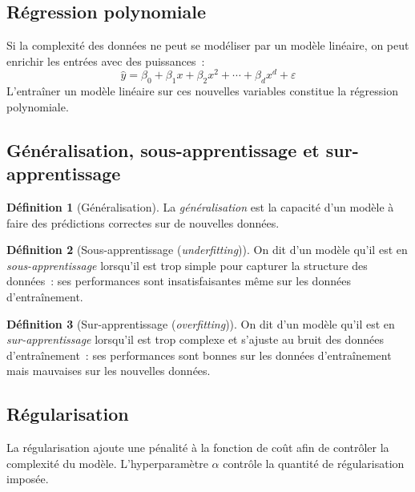 \documentclass[a4paper,12pt,twoside]{report}
\theoremstyle{definition}
\newtheorem{defi}{Définition}
\theoremstyle{plain}
\theoremstyle{remark}
\begin{document}
\subsection{Régression polynomiale}

Si la complexité des données ne peut se modéliser par un modèle linéaire, on peut enrichir
les entrées avec des puissances~:
\[
\hat{y} = \beta_0 + \beta_1 x + \beta_2 x^2 + \cdots + \beta_d x^d + \varepsilon
\]
L'entraîner un modèle linéaire sur ces nouvelles variables constitue la régression polynomiale.

\subsection{Généralisation, sous-apprentissage et sur-apprentissage}

\begin{defi}[Généralisation]
La \emph{généralisation} est la capacité d'un modèle à faire des prédictions correctes sur
de nouvelles données.
\end{defi}

\begin{defi}[Sous-apprentissage (\textit{underfitting})]
On dit d'un modèle qu'il est en \emph{sous-apprentissage} lorsqu'il est trop simple pour
capturer la structure des données~: ses performances sont insatisfaisantes même sur les
données d'entraînement.
\end{defi}

\begin{defi}[Sur-apprentissage (\textit{overfitting})]
On dit d'un modèle qu'il est en \emph{sur-apprentissage} lorsqu'il est trop complexe et
s'ajuste au bruit des données d'entraînement~: ses performances sont bonnes sur les données
d'entraînement mais mauvaises sur les nouvelles données.
\end{defi}

\subsection{Régularisation}
\label{subsec:regularisation}

La régularisation ajoute une pénalité à la fonction de coût afin de contrôler la complexité
du modèle. L'hyperparamètre $\alpha$ contrôle la quantité de régularisation imposée.
\end{document}

